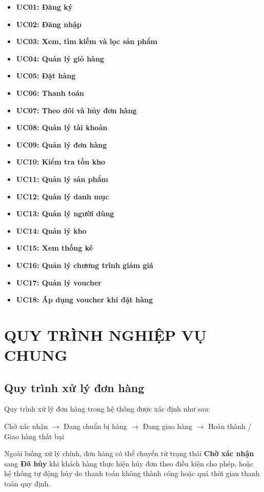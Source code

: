 \documentclass[12pt,a4paper]{article}
\begin{document}
\begin{itemize}
    \item \textbf{UC01: Đăng ký}
    \item \textbf{UC02: Đăng nhập}
    \item \textbf{UC03: Xem, tìm kiếm và lọc sản phẩm}
    \item \textbf{UC04: Quản lý giỏ hàng}
    \item \textbf{UC05: Đặt hàng}
    \item \textbf{UC06: Thanh toán}
    \item \textbf{UC07: Theo dõi và hủy đơn hàng}
    \item \textbf{UC08: Quản lý tài khoản}
    \item \textbf{UC09: Quản lý đơn hàng}
    \item \textbf{UC10: Kiểm tra tồn kho}
    \item \textbf{UC11: Quản lý sản phẩm}
    \item \textbf{UC12: Quản lý danh mục}
    \item \textbf{UC13: Quản lý người dùng}
    \item \textbf{UC14: Quản lý kho}
    \item \textbf{UC15: Xem thống kê}
    \item \textbf{UC16: Quản lý chương trình giảm giá}
    \item \textbf{UC17: Quản lý voucher}
    \item \textbf{UC18: Áp dụng voucher khi đặt hàng}
\end{itemize}

\section{QUY TRÌNH NGHIỆP VỤ CHUNG}

\subsection{Quy trình xử lý đơn hàng}

Quy trình xử lý đơn hàng trong hệ thống được xác định như sau:

\begin{center}
Chờ xác nhận $\rightarrow$ Đang chuẩn bị hàng $\rightarrow$ Đang giao hàng $\rightarrow$ Hoàn thành / Giao hàng thất bại
\end{center}

Ngoài luồng xử lý chính, đơn hàng có thể chuyển từ trạng thái \textbf{Chờ xác nhận} sang \textbf{Đã hủy} khi khách hàng thực hiện hủy đơn theo điều kiện cho phép, hoặc hệ thống tự động hủy do thanh toán không thành công hoặc quá thời gian thanh toán quy định.
\end{document}
